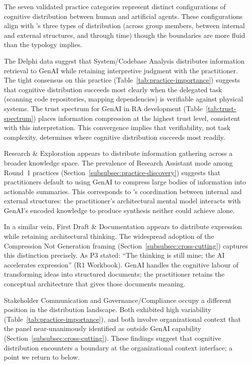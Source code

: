 The seven validated practice categories represent distinct configurations of
cognitive distribution between human and artificial agents. These
configurations align with \textcite{hollan_distributed_2000}'s three types of
distribution (across group members, between internal and external structures,
and through time) though the boundaries are more fluid than the typology
implies.

The Delphi data suggest that System/Codebase Analysis distributes information
retrieval to GenAI while retaining interpretive judgment with the practitioner.
The tight consensus on this practice
(Table~\ref{tab:practice-importance}) suggests that cognitive
distribution succeeds most clearly when the delegated task (scanning code
repositories, mapping dependencies) is verifiable against physical systems.
The trust spectrum for GenAI in RA development (Table~\ref{tab:trust-spectrum}) places information
compression at the highest trust level, consistent with this interpretation.
This convergence implies that verifiability, not task complexity, determines
where cognitive distribution succeeds most readily.

Research \& Exploration appears to distribute information gathering across a
broader knowledge space. The prevalence of Research Assistant mode among Round~1
practices (Section~\ref{subsubsec:practice-discovery}) suggests that
practitioners default to using GenAI to compress
large bodies of information into actionable summaries. This corresponds to
\textcite{hollan_distributed_2000}'s coordination between internal and external
structures: the practitioner's architectural mental model interacts with
GenAI's encoded knowledge to produce synthesis neither could achieve alone.

In a similar vein, First Draft \& Documentation appears to distribute
expression while retaining architectural thinking. The widespread adoption of
the Compression Not Generation framing (Section~\ref{subsubsec:cross-cutting})
captures this distinction precisely. As P3 stated: ``The thinking is still mine; the
AI accelerates expression'' (R1 Workbook). GenAI handles the cognitive labour
of transforming ideas into structured documents; the practitioner retains the
conceptual architecture that gives those documents meaning.

Stakeholder Communication and Governance/Compliance occupy a different position
in the distribution landscape. Both exhibited high variability
(Table~\ref{tab:practice-importance}), and both involve organizational context
that the panel near-unanimously identified as outside GenAI capability
(Section~\ref{subsubsec:cross-cutting}). These findings suggest that cognitive
distribution encounters a boundary at the organizational context interface; a
point we return to below.

